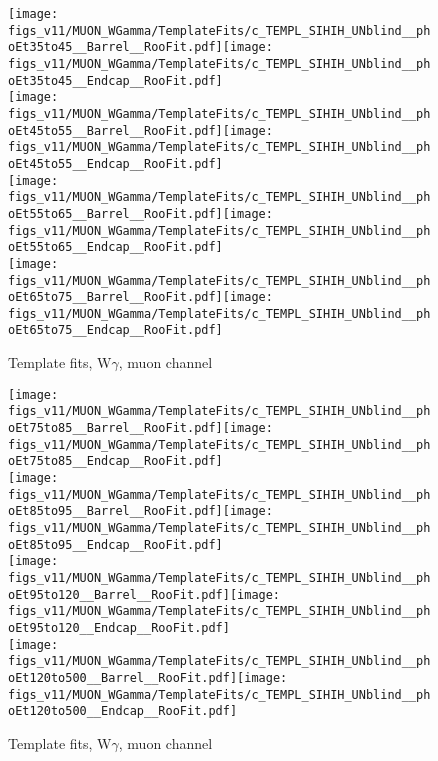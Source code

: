 \begin{figure}[htb]
  \begin{center}
   \texttt{[image: figs\_v11/MUON\_WGamma/TemplateFits/c\_TEMPL\_SIHIH\_UNblind\_\_phoEt35to45\_\_Barrel\_\_RooFit.pdf]}\texttt{[image: figs\_v11/MUON\_WGamma/TemplateFits/c\_TEMPL\_SIHIH\_UNblind\_\_phoEt35to45\_\_Endcap\_\_RooFit.pdf]}\\
   \texttt{[image: figs\_v11/MUON\_WGamma/TemplateFits/c\_TEMPL\_SIHIH\_UNblind\_\_phoEt45to55\_\_Barrel\_\_RooFit.pdf]}\texttt{[image: figs\_v11/MUON\_WGamma/TemplateFits/c\_TEMPL\_SIHIH\_UNblind\_\_phoEt45to55\_\_Endcap\_\_RooFit.pdf]}\\
   \texttt{[image: figs\_v11/MUON\_WGamma/TemplateFits/c\_TEMPL\_SIHIH\_UNblind\_\_phoEt55to65\_\_Barrel\_\_RooFit.pdf]}\texttt{[image: figs\_v11/MUON\_WGamma/TemplateFits/c\_TEMPL\_SIHIH\_UNblind\_\_phoEt55to65\_\_Endcap\_\_RooFit.pdf]}\\
   \texttt{[image: figs\_v11/MUON\_WGamma/TemplateFits/c\_TEMPL\_SIHIH\_UNblind\_\_phoEt65to75\_\_Barrel\_\_RooFit.pdf]}\texttt{[image: figs\_v11/MUON\_WGamma/TemplateFits/c\_TEMPL\_SIHIH\_UNblind\_\_phoEt65to75\_\_Endcap\_\_RooFit.pdf]}\\
  \label{fig:templateFits_SIHIH_MUON_2}
  \caption{Template fits, W$\gamma$, muon channel}
  \end{center}
\end{figure}

\begin{figure}[htb]
  \begin{center}
   \texttt{[image: figs\_v11/MUON\_WGamma/TemplateFits/c\_TEMPL\_SIHIH\_UNblind\_\_phoEt75to85\_\_Barrel\_\_RooFit.pdf]}\texttt{[image: figs\_v11/MUON\_WGamma/TemplateFits/c\_TEMPL\_SIHIH\_UNblind\_\_phoEt75to85\_\_Endcap\_\_RooFit.pdf]}\\
   \texttt{[image: figs\_v11/MUON\_WGamma/TemplateFits/c\_TEMPL\_SIHIH\_UNblind\_\_phoEt85to95\_\_Barrel\_\_RooFit.pdf]}\texttt{[image: figs\_v11/MUON\_WGamma/TemplateFits/c\_TEMPL\_SIHIH\_UNblind\_\_phoEt85to95\_\_Endcap\_\_RooFit.pdf]}\\
   \texttt{[image: figs\_v11/MUON\_WGamma/TemplateFits/c\_TEMPL\_SIHIH\_UNblind\_\_phoEt95to120\_\_Barrel\_\_RooFit.pdf]}\texttt{[image: figs\_v11/MUON\_WGamma/TemplateFits/c\_TEMPL\_SIHIH\_UNblind\_\_phoEt95to120\_\_Endcap\_\_RooFit.pdf]}\\
   \texttt{[image: figs\_v11/MUON\_WGamma/TemplateFits/c\_TEMPL\_SIHIH\_UNblind\_\_phoEt120to500\_\_Barrel\_\_RooFit.pdf]}\texttt{[image: figs\_v11/MUON\_WGamma/TemplateFits/c\_TEMPL\_SIHIH\_UNblind\_\_phoEt120to500\_\_Endcap\_\_RooFit.pdf]}\\
  \label{fig:templateFits_SIHIH_MUON_3}
  \caption{Template fits, W$\gamma$, muon channel}
  \end{center}
\end{figure}

